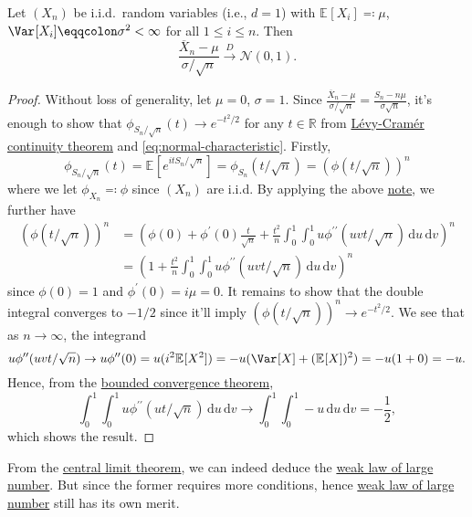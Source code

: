 \begin{theorem}\label{thm:CLT}
	Let \((X_n)\) be i.i.d.\ random variables (i.e., \(d = 1\)) with \(\mathbb{E}_{}[X_i] \eqqcolon \mu \), \(\Var_{}[X_i] \eqqcolon \sigma ^2 < \infty \) for all \(1 \leq i \leq n\). Then
	\[
		\frac{\overline{X} _n - \mu }{\sigma / \sqrt{n} } \overset{D}{\to } \mathcal{N} (0, 1).
	\]
\end{theorem}
\begin{proof}
	Without loss of generality, let \(\mu = 0\), \(\sigma = 1\). Since \(\frac{\overline{X} _n - \mu }{\sigma / \sqrt{n} } = \frac{S_n - n \mu }{\sigma \sqrt{n} }\), it's enough to show that \(\phi _{S_n / \sqrt{n} }(t) \to e^{-t^2 / 2}\) for any \(t \in \mathbb{R} \) from \hyperref[thm:Levy-Cramer-continuity]{Lévy-Cramér continuity theorem} and \autoref{eq:normal-characteristic}. Firstly,
	\[
		\phi _{S_n / \sqrt{n} } (t)
		= \mathbb{E}_{}[e^{i t S_n / \sqrt{n} }]
		= \phi _{S_n} (t / \sqrt{n} )
		= \left( \phi (t / \sqrt{n} ) \right) ^n
	\]
	where we let \(\phi _{X_n} \eqqcolon \phi \) since \((X_n)\) are i.i.d. By applying the above \hyperref[note:lec10]{note}, we further have
	\[
		\begin{split}
			\left( \phi (t / \sqrt{n} ) \right) ^n
			 & = \left( \phi (0) + \phi ^{\prime} (0) \frac{t}{\sqrt{n} } + \frac{t^2}{n} \int_{0}^{1} \int_{0}^{1} u \phi ^{\prime\prime} (u v t / \sqrt{n} ) \,\mathrm{d}u  \,\mathrm{d}v  \right) ^n \\
			 & = \left( 1 + \frac{t^2}{n}\int_{0}^{1} \int_{0}^{1} u \phi ^{\prime\prime} (u v t / \sqrt{n} ) \,\mathrm{d}u  \,\mathrm{d}v \right) ^n
		\end{split}
	\]
	since \(\phi (0) = 1\) and \(\phi ^{\prime} (0) = i \mu = 0\). It remains to show that the double integral converges to \(- 1 / 2\) since it'll imply \((\phi (t / \sqrt{n} ))^n \to e^{-t^2 / 2}\). We see that as \(n \to \infty \), the integrand
	\[
		u \phi ^{\prime\prime} (u v t / \sqrt{n} )
		\to u \phi ^{\prime\prime} (0)
		= u (i^2 \mathbb{E}_{}[X^2])
		= - u (\Var_{}[X] + (\mathbb{E}_{}[X] )^2 )
		= - u (1 + 0)
		= -u.
	\]
	Hence, from the \href{https://en.wikipedia.org/wiki/Dominated_convergence_theorem}{bounded convergence theorem},
	\[
		\int_{0}^{1} \int_{0}^{1} u \phi ^{\prime\prime} (u t / \sqrt{n} ) \,\mathrm{d}u \,\mathrm{d}v
		\to \int_{0}^{1} \int_{0}^{1} -u \,\mathrm{d}u \,\mathrm{d}v
		= -\frac{1}{2},
	\]
	which shows the result.
\end{proof}

\begin{remark}
	From the \hyperref[thm:CLT]{central limit theorem}, we can indeed deduce the \hyperref[thm:WLLN]{weak law of large number}. But since the former requires more conditions, hence \hyperref[thm:WLLN]{weak law of large number} still has its own merit.
\end{remark}

